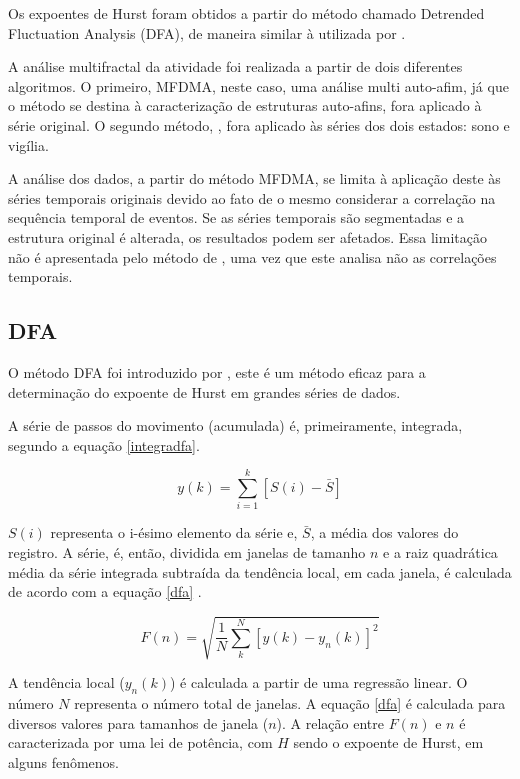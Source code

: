 \documentclass{ufscThesis}
\begin{document}
Os expoentes de Hurst foram obtidos a partir do método chamado Detrended Fluctuation Analysis (DFA), de maneira similar à utilizada por . \par
A análise multifractal da atividade foi realizada a partir de dois diferentes algoritmos. O primeiro, MFDMA\cite{Gu2010}, neste caso, uma análise multi auto-afim, já que o método se destina à caracterização de estruturas auto-afins, fora aplicado à série original. O segundo método, , fora aplicado às séries dos dois estados: sono e vigília.\par
A análise dos dados, a partir do método MFDMA, se limita à aplicação deste às séries temporais originais devido ao fato de o mesmo considerar a correlação na sequência temporal de eventos. Se as séries temporais são segmentadas e a estrutura original é alterada, os resultados podem ser afetados. Essa limitação não é apresentada pelo método de , uma vez que este analisa não as correlações temporais.

\subsection{DFA}
O método DFA foi introduzido por , este é um método eficaz para a determinação do expoente de Hurst em grandes séries de dados. \par
A série de passos do movimento (acumulada) é, primeiramente, integrada, segundo a equação \ref{integradfa}.

\begin{equation}
y(k) = \sum_{i=1}^{k} [S(i) - \bar{S}]
\label{integradfa}
\end{equation}

$S(i)$ representa o i-ésimo elemento da série e, $\bar{S}$, a média dos valores do registro. A série, é, então, dividida em janelas de tamanho $n$ e a raiz quadrática média da série integrada subtraída da tendência local, em cada janela, é calculada de acordo com a equação \ref{dfa} \cite{Peng1995}.

\begin{equation}
F(n) = \sqrt{\frac{1}{N} \sum_{k}^{N} [y(k) - y_{n}(k)]^{2}}
\label{dfa}
\end{equation}

A tendência local ($y_{n}(k)$) é calculada a partir de uma regressão linear. O número $N$ representa o número total de janelas. A equação \ref{dfa} é calculada para diversos valores para tamanhos de janela ($n$). A relação entre $F(n)$ e $n$ é caracterizada por uma lei de potência, com $H$ sendo o expoente de Hurst, em alguns fenômenos.
\end{document}
